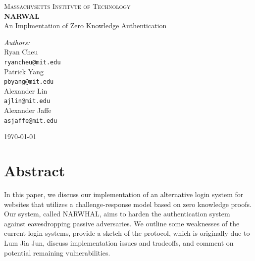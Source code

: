 \documentclass[11pt]{article}
\begin{document}
\begin{titlepage}

\begin{center}

\textsc{\LARGE Massachvsetts Institvte of Technology}\\[0.5cm]


{ \huge \bfseries NARWAL \\[0.4cm] }
{\Large An Implmentation of Zero Knowledge Authentication}\\[0.5cm]


\begin{minipage}{0.4\textwidth}
\begin{flushleft} \large
\emph{Authors:}\\[0.5cm]
Ryan Cheu \\
{\tt ryancheu@mit.edu} \\[1cm]
Patrick Yang \\
{\tt pbyang@mit.edu} \\[1cm]
Alexander Lin \\
{\tt ajlin@mit.edu} \\[1cm]
Alexander Jaffe \\
{\tt asjaffe@mit.edu}
\end{flushleft}
\end{minipage}
\begin{minipage}{0.4\textwidth}
\begin{flushright} \large

\end{flushright}
\end{minipage}

\vfill

{\large \today}

\end{center}

\end{titlepage}

\section{Abstract}

In this paper, we discuss our implementation of an alternative login system for websites that utilizes a challenge-response model based on zero knowledge proofs.  Our system, called NARWHAL, aims to harden the authentication system against eavesdropping passive adversaries.  We outline some weaknesses of the current login systems, provide a sketch of the protocol, which is originally due to Lum Jia Jun, discuss implementation issues and tradeoffs, and comment on potential remaining vulnerabilities.
\end{document}
